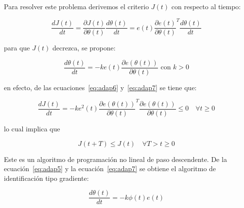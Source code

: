             Para resolver este problema derivemos el criterio $J(t)$ con respecto al tiempo:

            \begin{equation} \label{eq:adap6}
                \frac{d J(t)}{dt} = \frac{\partial J(t)}{\partial \theta(t)} \frac{d \theta(t)}{dt} = e(t) \frac{\partial e(t)}{\partial \theta(t)}^T \frac{d \theta(t)}{dt}
            \end{equation}

            para que $J(t)$ decrezca, se propone:

            \begin{equation}\label{eq:adap7}
                \frac{d \theta(t)}{dt} = -k e(t) \frac{\partial e(\theta(t))}{\partial \theta(t)} \text{ con } k > 0
            \end{equation}

            en efecto, de las ecuaciones~\ref{eq:adap6} y~\ref{eq:adap7} se tiene que:

            \begin{equation*}
                \frac{d J(t)}{dt} = -k e^2(t) \frac{\partial e(\theta(t))}{\partial \theta(t)}^T \frac{\partial e(\theta(t))}{\partial \theta(t)} \le 0 \quad \forall t \ge 0
            \end{equation*}

            lo cual implica que

            \begin{equation}
                J(t + T) \le J(t) \quad \forall T > t \ge 0
            \end{equation}

            Este es un algoritmo de programación no lineal de paso descendente.
            De la ecuación~\ref{eq:adap5} y la ecuación~\ref{eq:adap7} se obtiene el algoritmo de identificación tipo gradiente:

            \begin{equation} \label{eq:adap7}
                \frac{d \theta(t)}{dt} = -k \phi(t)e(t)
            \end{equation}


